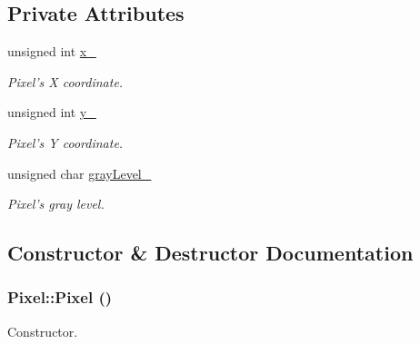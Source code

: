 \subsection*{Private Attributes}
\begin{CompactItemize}
\item 
\hypertarget{class_pixel_9f8a45ad3cbcab59543e4f7d4842ae6d}{
unsigned int \hyperlink{class_pixel_9f8a45ad3cbcab59543e4f7d4842ae6d}{x\_\-}}
\label{class_pixel_9f8a45ad3cbcab59543e4f7d4842ae6d}

\begin{CompactList}\small\item\em Pixel's X coordinate. \item\end{CompactList}\item 
\hypertarget{class_pixel_da45113dcf9ef4a0c3d5052db42da355}{
unsigned int \hyperlink{class_pixel_da45113dcf9ef4a0c3d5052db42da355}{y\_\-}}
\label{class_pixel_da45113dcf9ef4a0c3d5052db42da355}

\begin{CompactList}\small\item\em Pixel's Y coordinate. \item\end{CompactList}\item 
\hypertarget{class_pixel_e66fe85e02a9fe41e01ee520b87642e0}{
unsigned char \hyperlink{class_pixel_e66fe85e02a9fe41e01ee520b87642e0}{grayLevel\_\-}}
\label{class_pixel_e66fe85e02a9fe41e01ee520b87642e0}

\begin{CompactList}\small\item\em Pixel's gray level. \item\end{CompactList}\end{CompactItemize}


\subsection{Constructor \& Destructor Documentation}
\hypertarget{class_pixel_27ad99a2f705e635c42d242d530d4756}{
\subsubsection[Pixel]{\setlength{\rightskip}{0pt plus 5cm}Pixel::Pixel ()}}
\label{class_pixel_27ad99a2f705e635c42d242d530d4756}


Constructor. 

